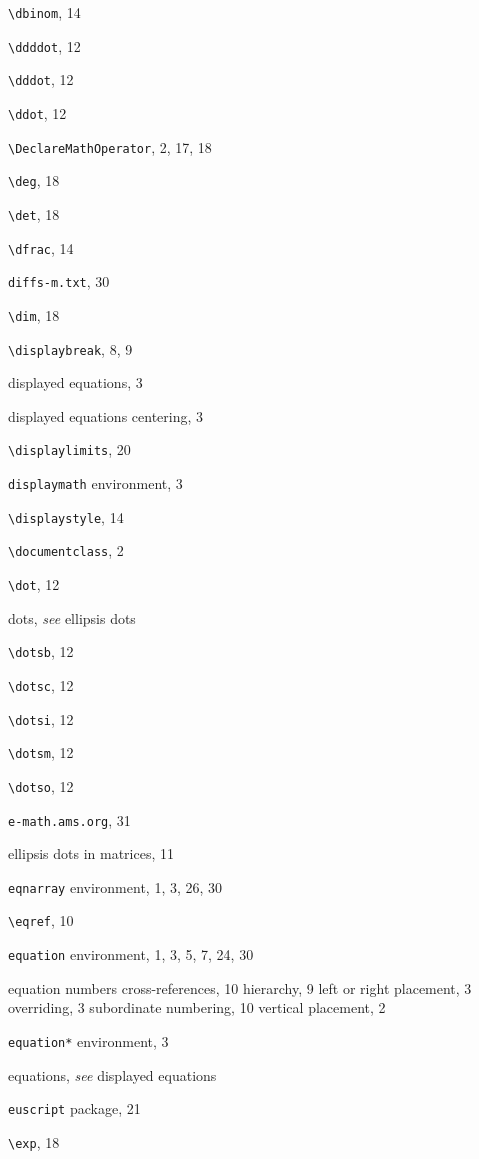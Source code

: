 \documentclass[leqno,titlepage,openany]{amsldoc}[1999/12/13]
\providecommand{\see}[2]{\textit{see} #1}
\begin{document}
\begin{theindex}
  \item \verb*+\dbinom+, 14
  \item \verb*+\ddddot+, 12
  \item \verb*+\dddot+, 12
  \item \verb*+\ddot+, 12
  \item \verb*+\DeclareMathOperator+, 2, 17, 18
  \item \verb*+\deg+, 18
  \item \verb*+\det+, 18
  \item \verb*+\dfrac+, 14
  \item \texttt{diffs-m.txt}, 30
  \item \verb*+\dim+, 18
  \item \verb*+\displaybreak+, 8, 9
  \item displayed   equations, 3
  \item displayed equations
    \subitem centering, 3
  \item \verb*+\displaylimits+, 20
  \item \texttt{displaymath} environment, 3
  \item \verb*+\displaystyle+, 14
  \item \verb*+\documentclass+, 2
  \item \verb*+\dot+, 12
  \item dots, \see{ellipsis dots}{11}
  \item \verb*+\dotsb+, 12
  \item \verb*+\dotsc+, 12
  \item \verb*+\dotsi+, 12
  \item \verb*+\dotsm+, 12
  \item \verb*+\dotso+, 12

  \indexspace

  \item \texttt{e-math.ams.org}, 31
  \item ellipsis dots
    \subitem in matrices, 11
  \item \texttt{eqnarray} environment, 1, 3, 26, 30
  \item \verb*+\eqref+, 10
  \item \texttt{equation} environment, 1, 3, 5, 7, 24, 30
  \item equation numbers
    \subitem cross-references, 10
    \subitem hierarchy, 9
    \subitem left or right placement, 3
    \subitem overriding, 3
    \subitem subordinate numbering, 10
    \subitem vertical placement, 2
  \item \texttt{equation*} environment, 3
  \item equations, \see{displayed equations}{3}
  \item \texttt{euscript} package, 21
  \item \verb*+\exp+, 18


\end{theindex}
\end{document}
